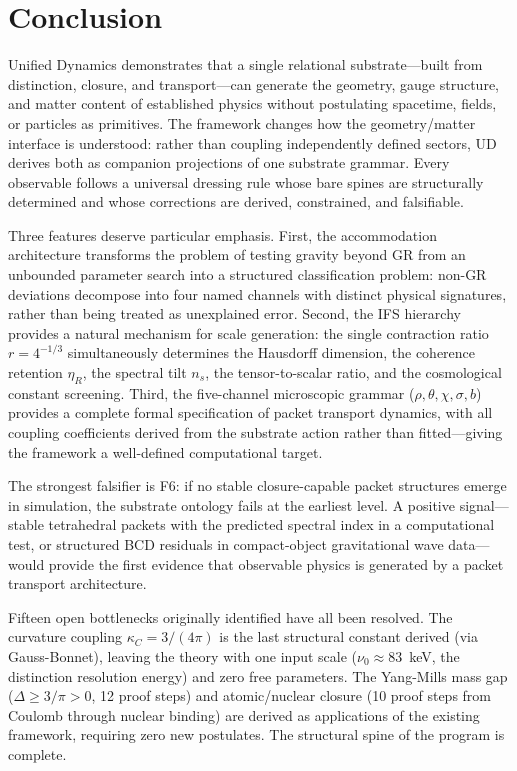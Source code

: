 \documentclass[11pt,twocolumn]{article}
\begin{document}
\section{Conclusion}
\label{sec:conclusion}

Unified Dynamics demonstrates that a single relational substrate---built from distinction, closure, and transport---can generate the geometry, gauge structure, and matter content of established physics without postulating spacetime, fields, or particles as primitives.
The framework changes how the geometry/matter interface is understood: rather than coupling independently defined sectors, UD derives both as companion projections of one substrate grammar.
Every observable follows a universal dressing rule whose bare spines are structurally determined and whose corrections are derived, constrained, and falsifiable.

Three features deserve particular emphasis.
First, the accommodation architecture transforms the problem of testing gravity beyond GR from an unbounded parameter search into a structured classification problem: non-GR deviations decompose into four named channels with distinct physical signatures, rather than being treated as unexplained error.
Second, the IFS hierarchy provides a natural mechanism for scale generation: the single contraction ratio $r = 4^{-1/3}$ simultaneously determines the Hausdorff dimension, the coherence retention $\eta_R$, the spectral tilt $n_s$, the tensor-to-scalar ratio, and the cosmological constant screening.
Third, the five-channel microscopic grammar ($\rho, \theta, \chi, \sigma, b$) provides a complete formal specification of packet transport dynamics, with all coupling coefficients derived from the substrate action rather than fitted---giving the framework a well-defined computational target.

The strongest falsifier is F6: if no stable closure-capable packet structures emerge in simulation, the substrate ontology fails at the earliest level.
A positive signal---stable tetrahedral packets with the predicted spectral index in a computational test, or structured BCD residuals in compact-object gravitational wave data\cite{ligo}---would provide the first evidence that observable physics is generated by a packet transport architecture.

Fifteen open bottlenecks originally identified have all been resolved.\cite{gravityprog}
The curvature coupling $\kappa_C = 3/(4\pi)$ is the last structural constant derived (via Gauss-Bonnet), leaving the theory with one input scale ($\nu_0 \approx 83$~keV, the distinction resolution energy) and zero free parameters.
The Yang-Mills mass gap ($\Delta \geq 3/\pi > 0$, 12 proof steps) and atomic/nuclear closure (10 proof steps from Coulomb through nuclear binding) are derived as applications of the existing framework, requiring zero new postulates.
The structural spine of the program is complete.
\end{document}
